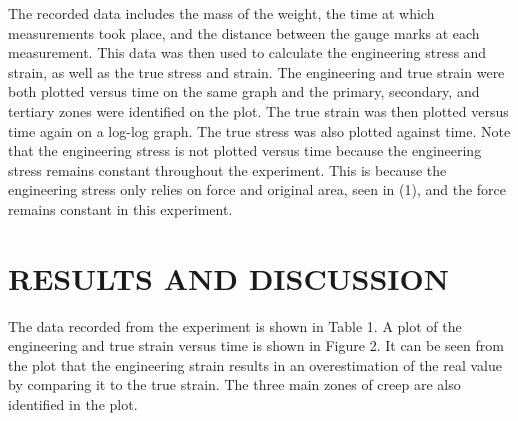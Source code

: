 \documentclass[12pt]{article}
\begin{document}
The recorded data includes the mass of the weight, the time at which measurements took place, and the distance between the gauge marks at each measurement. This data was then used to calculate the engineering stress and strain, as well as the true stress and strain. The engineering and true strain were both plotted versus time on the same graph and the primary, secondary, and tertiary zones were identified on the plot. The true strain was then plotted versus time again on a log-log graph. The true stress was also plotted against time. Note that the engineering stress is not plotted versus time because the engineering stress remains constant throughout the experiment. This is because the engineering stress only relies on force and original area, seen in (1), and the force remains constant in this experiment.
\bigskip



\section*{\fontsize{12}{12}\selectfont RESULTS AND DISCUSSION}
The data recorded from the experiment is shown in Table 1. A plot of the engineering and true strain versus time is shown in Figure 2. It can be seen from the plot that the engineering strain results in an overestimation of the real value by comparing it to the true strain. The three main zones of creep are also identified in the plot. 

\newpage
\end{document}
